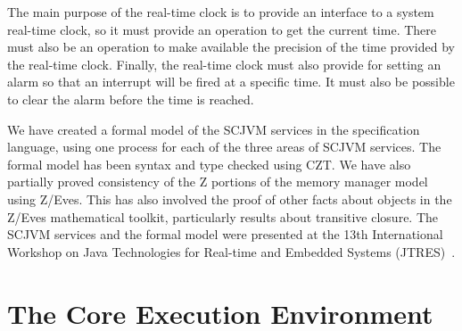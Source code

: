 \documentclass[a4paper,10pt]{report}
\begin{document}
The main purpose of the real-time clock is to provide an interface to
a system real-time clock, so it must provide an operation to get the
current time.
There must also be an operation to make available the precision of the
time provided by the real-time clock.
Finally, the real-time clock must also provide for setting an alarm so
that an interrupt will be fired at a specific time.
It must also be possible to clear the alarm before the time is reached.

We have created a formal model of the SCJVM services in the \Circus{}
specification language, using one \Circus{} process for each of the
three areas of SCJVM services.
The formal model has been syntax and type checked using CZT.
We have also partially proved consistency of the Z portions of the
memory manager model using Z/Eves.
This has also involved the proof of other facts about objects in the
Z/Eves mathematical toolkit, particularly results about transitive
closure.
The SCJVM services and the formal model were presented at the 13th
International Workshop on Java Technologies for Real-time and Embedded
Systems (JTRES)~\cite{baxter2015a}.

\section{The Core Execution Environment}

\end{document}
